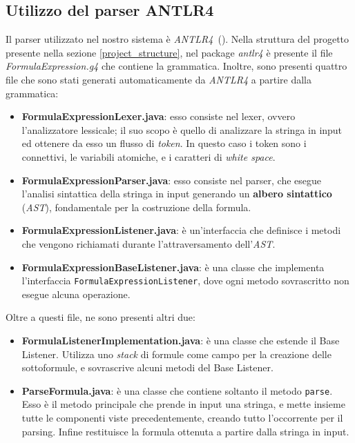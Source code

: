 \documentclass[a4paper,12pt]{report}
\begin{document}
\subsection{Utilizzo del parser ANTLR4}
Il parser utilizzato nel nostro sistema è \emph{ANTLR4}~(\cite{Parr13}). Nella struttura del progetto presente nella sezione \ref{project_structure}, nel package \emph{antlr4} è presente il file \emph{FormulaExpression.g4} che contiene la grammatica. Inoltre, sono presenti quattro file che sono stati generati automaticamente da \emph{ANTLR4} a partire dalla grammatica:
\begin{itemize}
    \item \textbf{FormulaExpressionLexer.java}:
    esso consiste nel lexer, ovvero l'analizzatore lessicale; il suo scopo è quello di analizzare la stringa in input ed ottenere da esso un flusso di \emph{token}. In questo caso i token sono i connettivi, le variabili atomiche, e i caratteri di \emph{white space}.
    \item \textbf{FormulaExpressionParser.java}:
    esso consiste nel parser, che esegue l'analisi sintattica della stringa in input generando un \textbf{albero sintattico} (\emph{AST}), fondamentale per la costruzione della formula.
    \item \textbf{FormulaExpressionListener.java}:
    è un'interfaccia che definisce i metodi che vengono richiamati durante l'attraversamento dell'\emph{AST}.
    \item \textbf{FormulaExpressionBaseListener.java}:
    è una classe che implementa l'interfaccia \texttt{FormulaExpressionListener}, dove ogni metodo sovrascritto non esegue alcuna operazione.
\end{itemize}
Oltre a questi file, ne sono presenti altri due:
\begin{itemize}
    \item \textbf{FormulaListenerImplementation.java}:
    è una classe che estende il Base Listener. Utilizza uno \emph{stack} di formule come campo per la creazione delle sottoformule, e sovrascrive alcuni metodi del Base Listener.
    \item \textbf{ParseFormula.java}:
    è una classe che contiene soltanto il metodo \texttt{parse}. Esso è il metodo principale che prende in input una stringa, e mette insieme tutte le componenti viste precedentemente, creando tutto l'occorrente per il parsing. Infine restituisce la formula ottenuta a partire dalla stringa in input.
\end{itemize}
\end{document}
